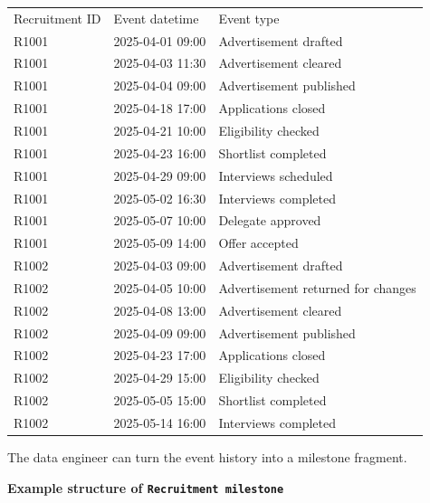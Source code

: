 \documentclass[10pt,openany,10pt]{book}
\newcounter{none}
\let\podeToprule\toprule
\let\podeMidrule\midrule
\let\podeBottomrule\bottomrule
\renewcommand{\toprule}{\arrayrulecolor{pbiGrid}\podeToprule}
\renewcommand{\midrule}{\arrayrulecolor{pbiGrid}\podeMidrule}
\renewcommand{\bottomrule}{\arrayrulecolor{pbiGrid}\podeBottomrule}
\begin{document}
{\def\LTcaptype{none} %
\begin{longtable}[]{@{}lll@{}}
\toprule\noalign{}
Recruitment ID & Event datetime & Event type \\
\midrule\noalign{}
\endhead
\bottomrule\noalign{}
\endlastfoot
R1001 & 2025-04-01 09:00 & Advertisement drafted \\
R1001 & 2025-04-03 11:30 & Advertisement cleared \\
R1001 & 2025-04-04 09:00 & Advertisement published \\
R1001 & 2025-04-18 17:00 & Applications closed \\
R1001 & 2025-04-21 10:00 & Eligibility checked \\
R1001 & 2025-04-23 16:00 & Shortlist completed \\
R1001 & 2025-04-29 09:00 & Interviews scheduled \\
R1001 & 2025-05-02 16:30 & Interviews completed \\
R1001 & 2025-05-07 10:00 & Delegate approved \\
R1001 & 2025-05-09 14:00 & Offer accepted \\
R1002 & 2025-04-03 09:00 & Advertisement drafted \\
R1002 & 2025-04-05 10:00 & Advertisement returned for changes \\
R1002 & 2025-04-08 13:00 & Advertisement cleared \\
R1002 & 2025-04-09 09:00 & Advertisement published \\
R1002 & 2025-04-23 17:00 & Applications closed \\
R1002 & 2025-04-29 15:00 & Eligibility checked \\
R1002 & 2025-05-05 15:00 & Shortlist completed \\
R1002 & 2025-05-14 16:00 & Interviews completed \\
\end{longtable}
}

The data engineer can turn the event history into a milestone fragment.

\textbf{Example structure of
\texttt{\textquotesingle{}Recruitment\ milestone\textquotesingle{}}}
\end{document}
